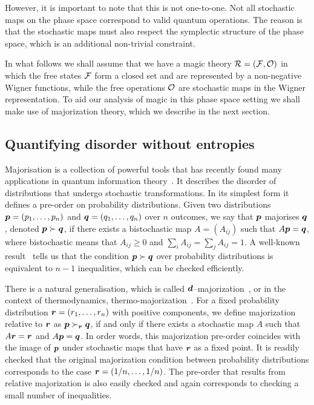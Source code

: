 \documentclass[pra,
aps,
twocolumn,
superscriptaddress,
groupedaddress,
nofootinbib,
reprint
]{revtex4-1}
\begin{document}
However, it is important to note that this is not one-to-one. Not all stochastic maps on the phase space correspond to valid quantum operations. The reason is that the stochastic maps must also respect the symplectic structure of the phase space, which is an additional non-trivial constraint.

In what follows we shall assume that we have a magic theory ${\mathcal R} = ({\mathcal F}, {\mathcal O})$ in which the free states ${\mathcal F}$ form a closed set and are represented by a non-negative Wigner functions, while the free operations ${\mathcal O}$ are stochastic maps in the Wigner representation. To aid our analysis of magic in this phase space setting we shall make use of majorization theory, which we describe in the next section.



\subsection{Quantifying disorder without entropies}
\label{sec:major}

Majorisation is a collection of powerful tools that has recently found many applications in quantum information theory~\cite{Nielsen_1999, cit:cwiklinski, cit:lostaglio2, cit:gour, cit:gour2, Horodecki_2003, Vallejos_2021}.
It describes the disorder of distributions that undergo stochastic transformations. In its simplest form it defines a pre-order on probability distributions. Given two distributions $\boldsymbol{p}= (p_1, \dots, p_n)$ and $\boldsymbol{q} = (q_1, \dots, q_n)$ over $n$ outcomes, we say that $\boldsymbol{p}$ majorises $\boldsymbol{q}$, denoted $\boldsymbol{p} \succ \boldsymbol{q}$, if there exists a bistochastic map $A = (A_{ij})$ such that $A\boldsymbol{p} = \boldsymbol{q}$, where bistochastic means that $A_{ij} \geq 0$ and $\sum_i A_{ij} = \sum_j A_{ij} = 1$. A well-known result~\cite{cit:marshall} tells us that the condition $ \boldsymbol{p} \succ \boldsymbol{q}$ over probability distributions is equivalent to $n-1$ inequalities, which can be checked efficiently.

There is a natural generalisation, which is called $\bm{d}$--majorization~\cite{Veinott_1971}, or in the context of thermodynamics, thermo-majorization~\cite{cit:horodecki2013}. For a fixed probability distribution $\boldsymbol{r} = (r_1, \dots, r_n)$ with positive components, we define majorization relative to $\boldsymbol{r}$ as $\boldsymbol{p} \succ_{\boldsymbol{r}} \boldsymbol{q}$, if and only if there exists a stochastic map $A$ such that $A\boldsymbol{r} = \boldsymbol{r}$ and $A \boldsymbol{p} = \boldsymbol{q}$. In order words, this majorization pre-order coincides with the image of $\boldsymbol{p}$ under stochastic maps that have $\boldsymbol{r}$ as a fixed point. It is readily checked that the original majorization condition between probability distributions corresponds to the case $\boldsymbol{r} = (1/n, \dots, 1/n)$. The pre-order that results from relative majorization is also easily checked and again corresponds to checking a small number of inequalities.
\end{document}
